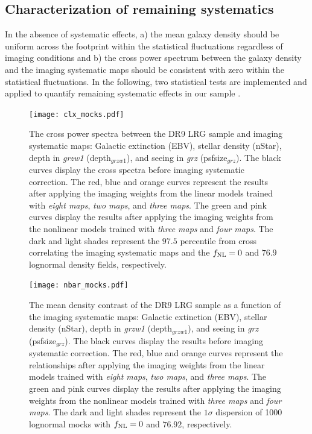 \subsection{Characterization of remaining systematics}
\label{ssec:characterization}

In the absence of systematic effects, a) the mean galaxy density should be uniform across the footprint within the statistical fluctuations regardless of imaging conditions and b) the cross power spectrum between the galaxy density and the imaging systematic maps should be consistent with zero within the statistical fluctuations. In the following, two statistical tests are implemented and applied to quantify remaining systematic effects in our sample \cite[see, also,][]{rezaie2021primordial}.

\begin{figure}
\centering
\texttt{[image: clx\_mocks.pdf]}
\caption{The cross power spectra between the DR9 LRG sample and imaging systematic maps: Galactic extinction (EBV), stellar density (nStar), depth in \textit{grzw1} (depth$_{grzw1}$), and seeing in \textit{grz} (psfsize$_{grz}$). The black curves display the cross spectra before imaging systematic correction. The red, blue and orange curves represent the results after applying the imaging weights from the linear models trained with \textit{eight maps}, \textit{two maps}, and \textit{three maps}. The green and pink curves display the results after applying the imaging weights from the nonlinear models trained with \textit{three maps} and \textit{four maps}. The dark and light shades represent the $97.5$ percentile from cross correlating the imaging systematic maps and the $f_{\rm NL}=0$ and $76.9$ lognormal density fields, respectively.}\label{fig:clxmock}
\end{figure}

\begin{figure}
\centering
\texttt{[image: nbar\_mocks.pdf]}
\caption{The mean density contrast of the DR9 LRG sample as a function of the imaging systematic maps: Galactic extinction (EBV), stellar density (nStar), depth in \textit{grzw1} (depth$_{grzw1}$), and seeing in \textit{grz} (psfsize$_{grz}$). The black curves display the results before imaging systematic correction. The red, blue and orange curves represent the relationships after applying the imaging weights from the linear models trained with \textit{eight maps}, \textit{two maps}, and \textit{three maps}. The green and pink curves display the results after applying the imaging weights from the nonlinear models trained with \textit{three maps} and \textit{four maps}. The dark and light shades represent the $1\sigma$ dispersion of 1000 lognormal mocks with $f_{\rm NL}=0$ and $76.92$, respectively.}\label{fig:nbarmock}
\end{figure}


